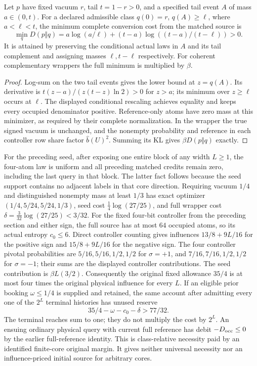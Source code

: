 \begin{lemma}\label{lem:v10floor}
Let $p$ have fixed vacuum $r$, tail $t=1-r>0$, and a specified tail event
$A$ of mass $a\in(0,t)$. For a declared admissible class
$q(0)=r$, $q(A)\ge\ell$, where $a<\ell<t$, the minimum complete
conversion cost from the matched source is
\[
 \min_qD(p\Vert q)
 =a\log(a/\ell)+(t-a)\log((t-a)/(t-\ell))>0.
\]
It is attained by preserving the conditional actual laws in $A$ and
its tail complement and assigning masses $\ell,t-\ell$ respectively.
For coherent complementary wrappers the full minimum is multiplied
by $\beta$.
\end{lemma}
\begin{proof}
Log-sum on the two tail events gives the lower bound at $z=q(A)$.
Its derivative is $t(z-a)/(z(t-z)\ln2)>0$ for $z>a$; its minimum
over $z\ge\ell$ occurs at $\ell$. The displayed conditional rescaling
achieves equality and keeps every occupied denominator positive.
Reference-only atoms have zero mass at this minimizer, as required by
their complete normalization. In the wrapper the true signed vacuum
is unchanged, and the nonempty probability and reference in each
controller row share factor $\widehat b(U)^2$. Summing its KL gives
$\beta D(p\Vert q)$ exactly.
\end{proof}

For the preceding seed, after exposing one entire block of any width
$L\ge1$, the four-atom law is uniform and all preceding matched
credits remain zero, including the last query in that block. The latter
fact follows because the seed support contains no adjacent labels in
that core direction. Requiring vacuum $1/4$ and distinguished
nonempty mass at least $1/3$ has exact optimizer
$(1/4,5/24,5/24,1/3)$, seed cost $\frac14\log(27/25)$, and full
wrapper cost $\delta=\frac3{32}\log(27/25)<3/32$.
For the fixed four-bit controller from the preceding section and either
sign, the full source has at most $64$ occupied atoms, so its actual
entropy $c_0\le6$. Direct controller counting gives influences
$13/8+9L/16$ for the positive sign and $15/8+9L/16$ for the negative
sign. The four controller pivotal probabilities are
$5/16,5/16,1/2,1/2$ for $\sigma=+1$, and
$7/16,7/16,1/2,1/2$ for $\sigma=-1$; their sums are the displayed
controller contributions. The seed contribution is $\beta L(3/2)$.
Consequently the original fixed allowance $35/4$ is at most four times
the original physical influence for every $L$. If an eligible prior
booking $\omega\le1/4$ is supplied and retained, the same account after
admitting every one of the $2^L$ terminal histories has unused reserve
\[
 35/4-\omega-c_0-\delta>77/32.
\]
The terminal reaches sum to one; they do not multiply the cost by
$2^L$. An ensuing ordinary physical query with current full reference
has debit $-D_{\rm occ}\le0$ by the earlier full-reference identity.
This is class-relative necessity paid by an identified finite-core
original margin. It gives neither universal necessity nor an
influence-priced initial source for arbitrary cores.

